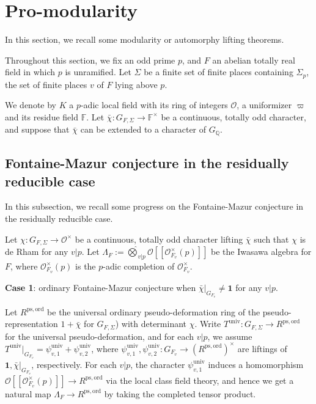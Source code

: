 \documentclass[a4paper, 12pt]{amsart}
\def\ps{\mathrm{ps}}
\def\ord{\mathrm{ord}}
\newcommand{\F}{\mathbb{F}}
\newcommand{\Q}{\mathbb{Q}}
\newcommand{\cO}{\mathcal{O}}
\begin{document}
    \section{Pro-modularity}
    In this section, we recall some modularity or automorphy lifting theorems.
    
    Throughout this section, we fix an odd prime $p$, and $F$ an abelian totally real field in which $p$ is unramified. Let $\Sigma$ be a finite set of finite places containing $\Sigma_p$, the set of finite places $v$ of $F$ lying above $p$. 
    
    We denote by $K$  a $p$-adic local field with its ring of integers $\cO$, a uniformizer $\varpi$ and its residue field $\F$. Let $\bar{\chi}: G_{F, \Sigma} \to \F^\times$ be a continuous, totally odd character, and suppose that $\bar{\chi} $ can be extended to a character of $G_{\Q}$.
    
    \subsection{Fontaine-Mazur conjecture in the residually reducible case}\label{sec deformation ring}
    In this subsection, we recall some progress on the Fontaine-Mazur conjecture in the residually reducible case.
    
    Let $\chi: G_{F, \Sigma} \to \cO^\times$ be a continuous, totally odd character lifting $ \bar{\chi}$ such that $\chi$ is de Rham for any $v|p$. Let $\Lambda_F:=\widehat{\bigotimes}_{v|p}\cO[[\cO_{F_v}^\times(p)]] $ be the Iwasawa algebra for $F$, where $ \cO_{F_v}^\times(p)$ is the $p$-adic completion of $ \cO_{F_v}^\times$.
    
    \textbf{Case 1}: ordinary Fontaine-Mazur conjecture when $ \bar{\chi}|_{G_{F_v}} \ne \mathbf{1}$ for any $v|p$. 
    
    Let $R^{\ps,\ord}$ be the universal ordinary pseudo-deformation ring of the pseudo-representation $1+\bar{\chi}$ for $G_{F, \Sigma} $) with determinant $\chi$. Write $T^{\operatorname{univ}}: G_{F, \Sigma} \to R^{\ps,\ord}$ for the universal pseudo-deformation, and for each $v|p$, we assume $T^{\operatorname{univ}}|_{G_{F_v}}=\psi^{\operatorname{univ}}_{v,1}+\psi^{\operatorname{univ}}_{v,2}$, where $\psi^{\operatorname{univ}}_{v,1},\psi^{\operatorname{univ}}_{v,2}:G_{F_v}\to (R^{\ps,\ord})^\times$ are liftings of $\mathbf{1},\bar{\chi}|_{G_{F_v}}$, respectively.
    For each $v|p$, the character $ \psi^{\operatorname{univ}}_{v,1}$ induces a homomorphism $\cO[[\cO_{F_v}^\times(p)]]\to R^{\ps,\ord} $ via the local class field theory, and hence we get a natural map $\Lambda_F \to R^{\ps,\ord} $ by taking the completed tensor product.
    
\end{document}
